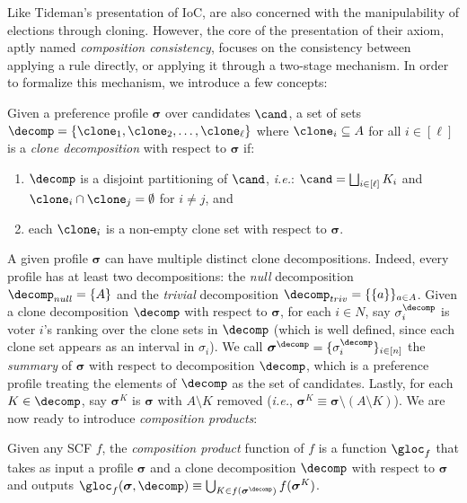 Like Tideman's presentation of IoC, \citet{Laffond96:Composition} are also concerned with the manipulability of elections through cloning. However, the core of the presentation of their axiom, aptly named \textit{composition consistency}, focuses on the consistency between applying a rule directly, or applying it through a two-stage mechanism. In order to formalize this mechanism, we introduce a few concepts:
  \begin{definition}\label{appdef:clone_grouping}
Given a preference profile $\boldsymbol{\sigma}$ over candidates $\cand$, a set of sets $\decomp=\{\clone_1,\clone_2,\ldots,\clone_\ell\}$ where $\clone_i \subseteq A$ for all $i\in [\ell]$ is a \emph{clone decomposition} with respect to $\boldsymbol{\sigma}$ if:
\begin{enumerate}
    \item $\decomp$ is a disjoint partitioning of $\cand$, \emph{i.e.}: $\cand=\bigsqcup_{i \in [\ell]} K_i$ and $\clone_i \cap \clone_j = \emptyset$ for $i \neq j$, and
    \item each $\clone_i$ is a non-empty clone set with respect to $\boldsymbol{\sigma}$.
\end{enumerate}
\end{definition}
A given profile $\boldsymbol{\sigma}$ can have multiple distinct clone decompositions. Indeed, every profile has at least two decompositions: the \textit{null} decomposition $\decomp_{null}=\{A\}$ and the \textit{trivial} decomposition $\decomp_{triv}=\{ \{a\}\}_{a \in A}$. Given a clone decomposition $\decomp$ with respect to $\boldsymbol{\sigma}$, for each $i \in N$, say $\sigma^\decomp_i$ is voter $i$'s ranking over the clone sets in $\decomp$ (which is well defined, since each clone set appears as an interval in $\sigma_i$). We call $\boldsymbol{\sigma}^\decomp = \{\sigma^\decomp_i\}_{i \in [n]}$ the \textit{summary} of $\boldsymbol{\sigma}$ with respect to decomposition $\decomp$, which is a preference profile treating the elements of $\decomp$ as the set of candidates. Lastly, for each $K \in \decomp$, say $\boldsymbol{\sigma}^{K}$ is $\boldsymbol{\sigma}$ with $A\setminus K$ removed (\emph{i.e.}, $\boldsymbol{\sigma}^{K} \equiv \boldsymbol{\sigma} \setminus (A \setminus K)$). We are now ready to introduce \textit{composition products}:

\begin{definition}\label{appdef:gloc} 
    Given any SCF $f$, the \emph{composition product} function of $f$ is a function $\gloc_f$ that takes as input a profile $\boldsymbol{\sigma}$ and a clone decomposition $\decomp$ with respect to $\boldsymbol{\sigma}$ and outputs $\gloc_f(\boldsymbol{\sigma}, \decomp) \equiv \bigcup_{K \in f\left(\boldsymbol{\sigma}^\decomp\right)  }f(\boldsymbol{\sigma}^K)$.
\end{definition}

